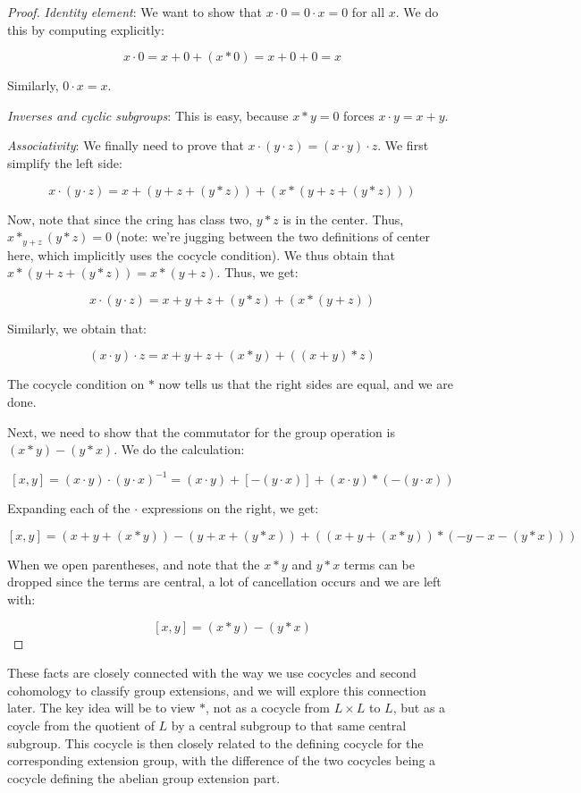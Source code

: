 \documentclass[10pt]{amsart}
\begin{document}
\begin{proof}
  {\em Identity element}: We want to show that $x \cdot 0 = 0 \cdot x = 0$ for
  all $x$. We do this by computing explicitly:

  $$x \cdot 0 = x + 0 + (x * 0) = x + 0 + 0 = x$$

  Similarly, $0 \cdot x = x$.

  {\em Inverses and cyclic subgroups}: This is easy, because $x * y =
  0$ forces $x \cdot y = x + y$.

  {\em Associativity}: We finally need to prove that $x \cdot (y \cdot
  z) = (x \cdot y) \cdot z$. We first simplify the left side:

  $$x \cdot (y \cdot z) = x  + (y + z + (y * z)) + (x * (y + z + (y * z)))$$

  Now, note that since the cring has class two, $y * z$ is in the
  center. Thus, $x *_{y + z} (y * z) = 0$ (note: we're jugging between
  the two definitions of center here, which implicitly uses the
  cocycle condition). We thus obtain that $x * (y + z + (y * z)) = x *
  (y + z)$. Thus, we get:

  $$x \cdot (y \cdot z) = x + y + z + (y * z) + (x * (y + z))$$

  Similarly, we obtain that:

  $$(x \cdot y) \cdot z = x + y + z + (x * y) + ((x + y) * z)$$

  The cocycle condition on $*$ now tells us that the right sides are
  equal, and we are done.

  Next, we need to show that the commutator for the group operation is
  $(x * y) - (y * x)$. We do the calculation:

  $$[x,y] = (x \cdot y) \cdot (y \cdot x)^{-1} = (x \cdot y) + [- (y \cdot x)] + (x \cdot y) * (-(y \cdot x))$$

  Expanding each of the $\cdot$ expressions on the right, we get:

  $$[x,y] = (x + y + (x * y)) - (y + x + (y * x)) + ((x + y + (x * y)) * (-y - x - (y * x)))$$

  When we open parentheses, and note that the $x * y$ and $y * x$
  terms can be dropped since the terms are central, a lot of
  cancellation occurs and we are left with:

  $$[x,y] = (x * y) - (y * x)$$

\end{proof}

These facts are closely connected with the way we use cocycles and
second cohomology to classify group extensions, and we will explore
this connection later. The key idea will be to view $*$, not as a
cocycle from $L \times L$ to $L$, but as a coycle from the quotient of
$L$ by a central subgroup to that same central subgroup. This cocycle
is then closely related to the defining cocycle for the corresponding
extension group, with the difference of the two cocycles being a
cocycle defining the abelian group extension part.
\end{document}
